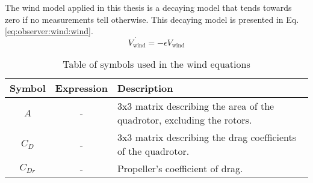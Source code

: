     The wind model applied in this thesis is a decaying model that tends
    towards zero if no measurements tell otherwise.
    This decaying model is presented in Eq. \eqref{eq:observer:wind:wind}.
    \begin{equation}
        \label{eq:observer:wind:wind}
        \dot{V_{\text{wind}}} = -\epsilon V_{\text{wind}}
    \end{equation}


    \begin{table}
        \begin{tabularx}{\tablewidth}{|c|c|X|}\hline
            \textbf{Symbol} & \textbf{Expression} & \textbf{Description} \\\hline
            $A$ & - & 3x3 matrix describing the area of the quadrotor, excluding the rotors. \\\hline
            $C_{D}$ & - & 3x3 matrix describing the drag coefficients of the quadrotor. \\\hline
            $C_{Dr}$ & - & Propeller's coefficient of drag. \\\hline
        \end{tabularx}
        \label{tbl:observer:wind:symbols}
        \caption{Table of symbols used in the wind equations}
    \end{table}
